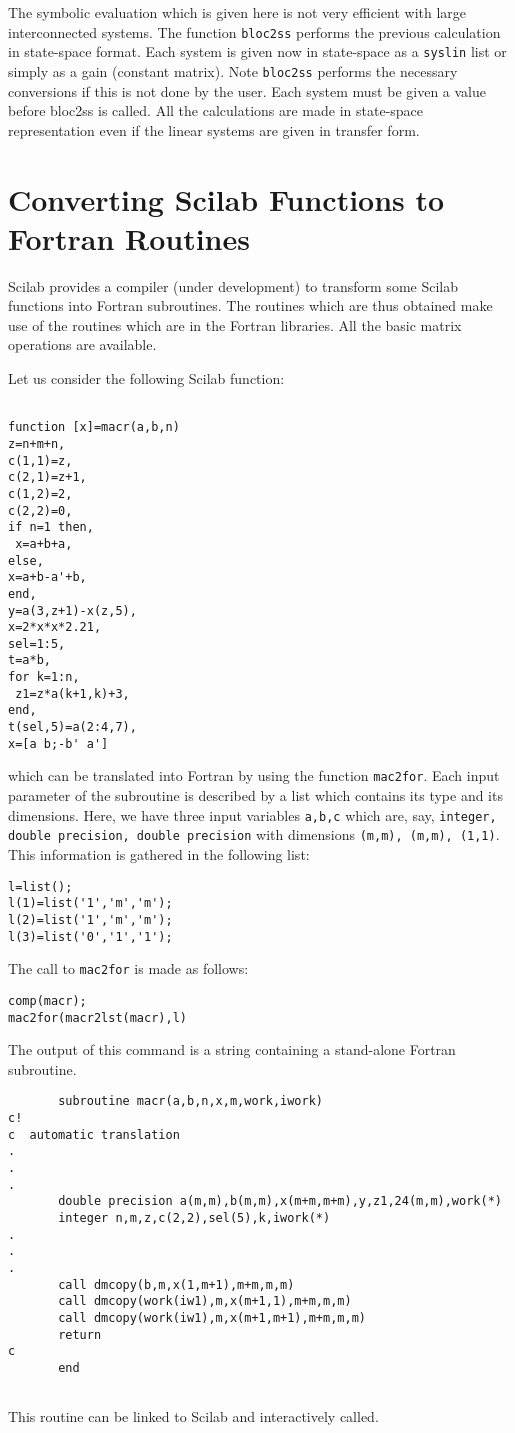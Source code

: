 The symbolic evaluation which is given here is not very efficient
with large interconnected systems. The function {\tt bloc2ss}
performs the previous calculation in state-space format.
Each system is given now in state-space 
as a {\tt syslin} list or simply as a gain (constant matrix). 
Note {\tt bloc2ss} performs the necessary conversions if this 
is not done by the user. Each system must be given a value before
bloc2ss is called. All the calculations are made in state-space
representation even if the linear systems are given in transfer form.

\section{Converting Scilab Functions to Fortran Routines}

Scilab provides a compiler (under development) to transform some Scilab 
functions
into Fortran subroutines. The routines which are thus obtained
make use of the routines which are in the Fortran libraries.
All the basic matrix operations are available.

Let us consider the following Scilab function:
\begin{verbatim}

function [x]=macr(a,b,n)
z=n+m+n,
c(1,1)=z,
c(2,1)=z+1,
c(1,2)=2,
c(2,2)=0,
if n=1 then,
 x=a+b+a,
else,
x=a+b-a'+b,
end,
y=a(3,z+1)-x(z,5),
x=2*x*x*2.21,
sel=1:5,
t=a*b,
for k=1:n,
 z1=z*a(k+1,k)+3,
end,
t(sel,5)=a(2:4,7),
x=[a b;-b' a']

\end{verbatim}

which can be translated into Fortran by using the function {\tt mac2for}.
Each input parameter of the subroutine is described by a list
which contains its type and its dimensions. Here, we have three
input variables {\tt a,b,c} which are, say, {\tt integer,
double precision, double precision} with dimensions
{\tt (m,m), (m,m), (1,1)}. This information is gathered
in the following list:
\begin{verbatim}
l=list();
l(1)=list('1','m','m');
l(2)=list('1','m','m');
l(3)=list('0','1','1');
\end{verbatim}
The call to {\tt mac2for} is made as follows:
\begin{verbatim}
comp(macr);
mac2for(macr2lst(macr),l)
\end{verbatim}
The output of this command is a string containing a stand-alone Fortran 
subroutine.
\begin{verbatim}
       subroutine macr(a,b,n,x,m,work,iwork)
c!
c  automatic translation
.
.
.
       double precision a(m,m),b(m,m),x(m+m,m+m),y,z1,24(m,m),work(*)
       integer n,m,z,c(2,2),sel(5),k,iwork(*)
.
.
.      
       call dmcopy(b,m,x(1,m+1),m+m,m,m)
       call dmcopy(work(iw1),m,x(m+1,1),m+m,m,m)
       call dmcopy(work(iw1),m,x(m+1,m+1),m+m,m,m)
       return
c
       end


\end{verbatim}
This routine can be linked to Scilab and interactively called.

